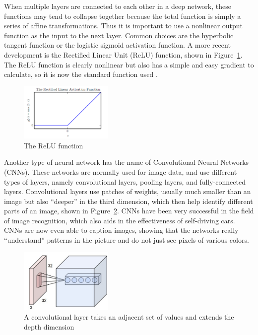 \documentclass[]{report}
\begin{document}
When multiple layers are connected to each other in a deep network, these functions may tend to collapse together because the total function is simply a series of affine transformations. Thus it is important to use a nonlinear output function as the input to the next layer. Common choices are the hyperbolic tangent function or the logistic sigmoid activation function. A more recent development is the Rectified Linear Unit (ReLU) function, shown in Figure~\ref{relu}. The ReLU function is clearly nonlinear but also has a simple and easy gradient to calculate, so it is now the standard function used \cite{Goodfellow-et-al-2016,ThreeGiants}.

\begin{figure}
	\centering
	\includegraphics[width=0.4\textwidth]{../images/relu}
	\caption{The ReLU function \cite{Goodfellow-et-al-2016}}
	\label{relu}
\end{figure}



Another type of neural network has the name of Convolutional Neural Networks (CNNs). These networks are normally used for image data, and use different types of layers, namely convolutional layers, pooling layers, and fully-connected layers. Convolutional layers use patches of weights, usually much smaller than an image but also ``deeper'' in the third dimension, which then help identify different parts of an image, shown in Figure~\ref{convolution-exp}. CNNs have been very successful in the field of image recognition, which also aids in the effectiveness of self-driving cars. CNNs are now even able to caption images, showing that the networks really ``understand'' patterns in the picture and do not just see pixels of various colors.


\begin{figure}
	\centering
	\includegraphics[width=0.4\textwidth]{../images/convolutions2}
	\caption{A convolutional layer takes an adjacent set of values and extends the depth dimension \cite{karpathy}}
	\label{convolution-exp}
\end{figure}
\end{document}
